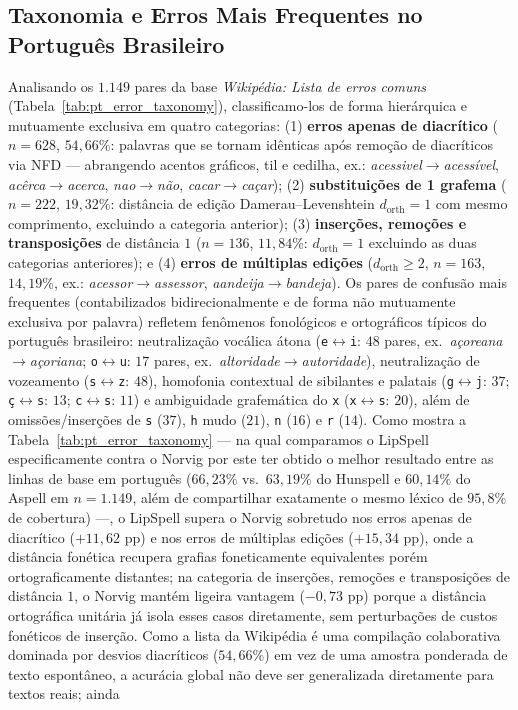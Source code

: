 \documentclass[a4paper, twocolumn, 11pt, twoside]{article}
\begin{document}
\subsection{Taxonomia e Erros Mais Frequentes no Português Brasileiro}
\label{sec:taxonomia}
Analisando os $1.149$ pares da base \textit{Wikipédia: Lista de erros comuns} (Tabela~\ref{tab:pt_error_taxonomy}), classificamo-los de forma hierárquica e mutuamente exclusiva em quatro categorias: (1) \textbf{erros apenas de diacrítico} ($n=628$, $54{,}66\%$: palavras que se tornam idênticas após remoção de diacríticos via NFD --- abrangendo acentos gráficos, til e cedilha, ex.: \textit{acessivel}$\rightarrow$\textit{acessível}, \textit{acêrca}$\rightarrow$\textit{acerca}, \textit{nao}$\rightarrow$\textit{não}, \textit{cacar}$\rightarrow$\textit{caçar}); (2) \textbf{substituições de 1 grafema} ($n=222$, $19{,}32\%$: distância de edição Damerau--Levenshtein $d_{\text{orth}}=1$ com mesmo comprimento, excluindo a categoria anterior); (3) \textbf{inserções, remoções e transposições} de distância $1$ ($n=136$, $11{,}84\%$: $d_{\text{orth}}=1$ excluindo as duas categorias anteriores); e (4) \textbf{erros de múltiplas edições} ($d_{\text{orth}} \ge 2$, $n=163$, $14{,}19\%$, ex.: \textit{acessor}$\rightarrow$\textit{assessor}, \textit{aandeija}$\rightarrow$\textit{bandeja}). Os pares de confusão mais frequentes (contabilizados bidirecionalmente e de forma não mutuamente exclusiva por palavra) refletem fenômenos fonológicos e ortográficos típicos do português brasileiro: neutralização vocálica átona (\texttt{e}$\leftrightarrow$\texttt{i}: $48$ pares, ex.\ \textit{açoreana}$\rightarrow$\textit{açoriana}; \texttt{o}$\leftrightarrow$\texttt{u}: $17$ pares, ex.\ \textit{altoridade}$\rightarrow$\textit{autoridade}), neutralização de vozeamento (\texttt{s}$\leftrightarrow$\texttt{z}: $48$), homofonia contextual de sibilantes e palatais (\texttt{g}$\leftrightarrow$\texttt{j}: $37$; \texttt{ç}$\leftrightarrow$\texttt{s}: $13$; \texttt{c}$\leftrightarrow$\texttt{s}: $11$) e ambiguidade grafemática do \texttt{x} (\texttt{x}$\leftrightarrow$\texttt{s}: $20$), além de omissões/inserções de \texttt{s} ($37$), \texttt{h} mudo ($21$), \texttt{n} ($16$) e \texttt{r} ($14$). Como mostra a Tabela~\ref{tab:pt_error_taxonomy} --- na qual comparamos o LipSpell especificamente contra o Norvig por este ter obtido o melhor resultado entre as linhas de base em português ($66{,}23\%$ vs.\ $63{,}19\%$ do Hunspell e $60{,}14\%$ do Aspell em $n=1.149$, além de compartilhar exatamente o mesmo léxico de $95{,}8\%$ de cobertura) ---, o LipSpell supera o Norvig sobretudo nos erros apenas de diacrítico ($+11{,}62$ pp) e nos erros de múltiplas edições ($+15{,}34$ pp), onde a distância fonética recupera grafias foneticamente equivalentes porém ortograficamente distantes; na categoria de inserções, remoções e transposições de distância $1$, o Norvig mantém ligeira vantagem ($-0{,}73$ pp) porque a distância ortográfica unitária já isola esses casos diretamente, sem perturbações de custos fonéticos de inserção. Como a lista da Wikipédia é uma compilação colaborativa dominada por desvios diacríticos ($54{,}66\%$) em vez de uma amostra ponderada de texto espontâneo, a acurácia global não deve ser generalizada diretamente para textos reais; ainda 
\end{document}
